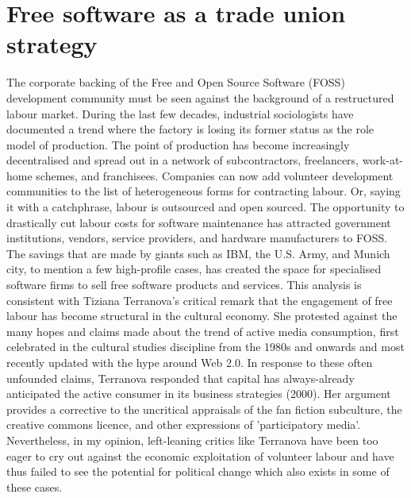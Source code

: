 \section{Free software as a trade union strategy}
\label{s:hackers_gnunited:fs_trade_union}

The corporate backing of the Free and Open Source Software (FOSS) development
community must be seen against the background of a restructured labour market.
During the last few decades, industrial sociologists have documented a trend
where the factory is losing its former status as the role model of production.
The point of production has become increasingly decentralised and spread out in
a network of subcontractors, freelancers, work-at-home schemes, and
franchisees\cite{gnunited-mcchesney_wood_foster98}. Companies can now add
volunteer development communities to the list of heterogeneous forms for
contracting labour. Or, saying it with a catchphrase, labour is outsourced and
open sourced. The opportunity to drastically cut labour costs for software
maintenance has attracted government institutions, vendors, service providers,
and hardware manufacturers to FOSS. The savings that are made by giants such as
IBM, the U.S. Army, and Munich city, to mention a few high-prof\hbox{}ile cases, has
created the space for specialised software f\hbox{}irms to sell free software
products and services. This analysis is consistent with Tiziana Terranova's
critical remark that the engagement of free labour has become structural in the
cultural economy. She protested against the many hopes and claims made about the
trend of active media consumption, f\hbox{}irst celebrated in the cultural studies
discipline from the 1980s and onwards and most recently updated with the hype
around Web 2.0. In response to these often unfounded claims, Terranova responded
that capital has always-already anticipated the active consumer in its business
strategies\cite{gnunited-terranova00} (2000). Her argument provides a corrective
to the uncritical appraisals of the fan f\hbox{}iction subculture, the creative
commons licence, and other expressions of 'participatory media'. Nevertheless,
in my opinion, left-leaning critics like Terranova have been too eager to cry
out against the economic exploitation of volunteer labour and have thus failed
to see the potential for political change which also exists in some of these
cases.

